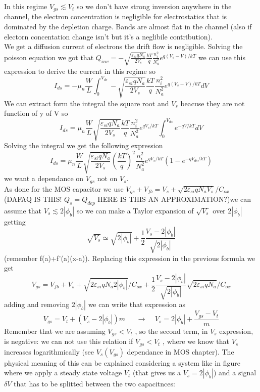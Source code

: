 In this regime $V_{gs} \lesssim V_t$ so we don't have strong inversion anywhere in the channel, the electron concentration is negligible for electrostatics that is dominated by the depletion charge. Bands are almost flat in the channel (also if electorn concentation change isn't but it's a neglibile contribution).\\
We get a diffusion current of electrons the drift flow is negligible. Solving the poisson equation we got that $Q_{inv}=-\sqrt{\frac{\varepsilon_{si}qN_a}{2V_s}}\frac{kT}{q}\frac{n_i^2}{N_a^2}e^{q(V_s-V)/kT}$ we can use this expression to derive the current in this regime so 
\begin{equation}
I_{ds}=-\mu_n \frac{W}{L}\int^{V_{ds}}_0-\sqrt{\frac{\varepsilon_{si}qN_a}{2V_s}}\frac{kT}{q}\frac{n_i^2}{N_a^2}e^{q(V_s-V)/kT}dV
\end{equation}
We can extract form the integral the square root and $V_s$ beacuse they are not function of y of V so 
\begin{equation}
I_{ds}=\mu_n \frac{W}{L}\sqrt{\frac{\varepsilon_{si}qN_a}{2V_s}}\frac{kT}{q}\frac{n_i^2}{N_a^2}e^{qV_s/kT}\int^{V_{ds}}_0e^{-qV/kT}dV
\end{equation}
Solving the integral we get the following expression
\begin{equation}
I_{ds}=\mu_n \frac{W}{L}\sqrt{\frac{\varepsilon_{si}qN_a}{2V_s}}\left(\frac{kT}{q}\right)^2\frac{n_i^2}{N_a^2}e^{qV_s/kT}\left(1-e^{-qV_{ds}/kT}\right)
\end{equation}
we want a dependance on $V_{gs}$ not on $V_s$.\\
As done for the MOS capacitor we use $V_{gs}+V_{fb}=V_s+\sqrt{2\varepsilon_{si}qN_aV_s}/C_{ox}$ (DAFAQ IS THIS! $Q_{s}=Q_{dep}$ HERE IS THIS AN APPROXIMATION?)we can assume that $V_s \lesssim 2|\phi_b|$ so we can make a Taylor expansion of $\sqrt{V_s}$ over $2|\phi_b|$ getting 
\begin{equation}
\sqrt{V_s}\simeq \sqrt{2|\phi_b|}+\frac{1}{2}\frac{V_{s}-2|\phi_b|}{\sqrt{2|\phi_b|}}
\end{equation}
(remember f(a)+f'(a)(x-a)). Replacing this expression in the previous formula we get 
\begin{equation}
V_{gs}=V_{fb}+V_s+\sqrt{2\varepsilon_{si}qN_a2|\phi_b|}/C_{ox}+\frac{1}{2}\frac{V_{s}-2|\phi_b|}{\sqrt{2|\phi_b|}}\sqrt{2\varepsilon_{si}qN_a}/C_{ox}
\end{equation}
adding and removing $2|\phi_b|$ we can write that expression as 
\begin{equation}
V_{gs}=V_t+(V_s-2|\phi_b|)m\ \ \ \ \ \ \ \rightarrow \ \ \ \ \ V_{s}=2|\phi_b|+\frac{V_{gs}-V_t}{m}
\end{equation}
Remember that we are assuming $V_{gs}<V_t$ , so the second term, in $V_s$ expression, is negative: we can not use this relation if $V_{gs}<V_t$ , where we know that $V_{s}$ increases logarithmically (see $V_s(V_{gs})$ dependance in MOS chapter).
The physical meaning of this can be explained considering a system like in figure where we apply a steady state voltage $V_t$ (that gives us a $V_s=2|\phi_b|$) and a signal $\delta V$ that has to be splitted between the two capacitnces:\\

